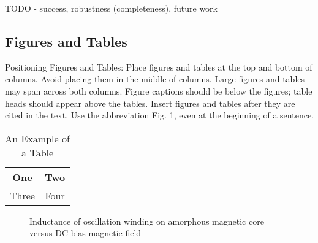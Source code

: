 \documentclass[letterpaper, 10 pt, conference]{ieeeconf}  %
\begin{document}
TODO - success, robustness (completeness), future work

\subsection{Figures and Tables}

Positioning Figures and Tables: Place figures and tables at the top and bottom of columns. Avoid placing them in the middle of columns. Large figures and tables may span across both columns. Figure captions should be below the figures; table heads should appear above the tables. Insert figures and tables after they are cited in the text. Use the abbreviation Fig. 1, even at the beginning of a sentence.

\begin{table}[h]
\caption{An Example of a Table}
\label{table_example}
\begin{center}
\begin{tabular}{|c||c|}
\hline
One & Two\\
\hline
Three & Four\\
\hline
\end{tabular}
\end{center}
\end{table}

\begin{figure}[thpb]
	\centering
	\caption{Inductance of oscillation winding on amorphous magnetic core versus DC bias magnetic field}
	\label{figurelabel}
\end{figure}

\addtolength{\textheight}{-12cm}   %

\end{document}
